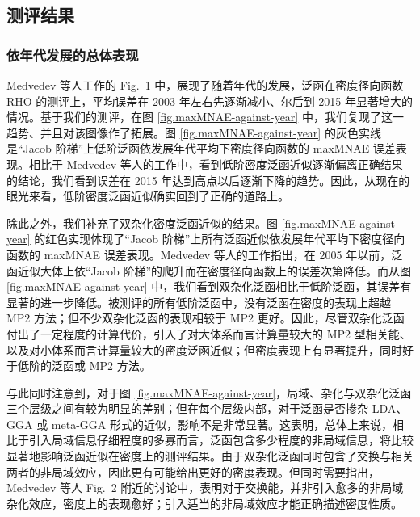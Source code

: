 \subsection{测评结果}

\subsubsection{依年代发展的总体表现}

Medvedev 等人工作的 Fig.\ 1 中，展现了随着年代的发展，泛函在密度径向函数 RHO 的测评上，平均误差在 2003 年左右先逐渐减小、尔后到 2015 年显著增大的情况。基于我们的测评，在图 \ref{fig.maxMNAE-against-year} 中，我们复现了这一趋势、并且对该图像作了拓展。图 \ref{fig.maxMNAE-against-year} 的灰色实线是“Jacob 阶梯”上低阶泛函依发展年代平均下密度径向函数的 maxMNAE 误差表现。相比于 Medvedev 等人的工作中，看到低阶密度泛函近似逐渐偏离正确结果的结论，我们看到误差在 2015 年达到高点以后逐渐下降的趋势。因此，从现在的眼光来看，低阶密度泛函近似确实回到了正确的道路上。

除此之外，我们补充了双杂化密度泛函近似的结果。图 \ref{fig.maxMNAE-against-year} 的红色实现体现了“Jacob 阶梯”上所有泛函近似依发展年代平均下密度径向函数的 maxMNAE 误差表现。Medvedev 等人的工作指出，在 2005 年以前，泛函近似大体上依“Jacob 阶梯”的爬升而在密度径向函数上的误差次第降低。而从图 \ref{fig.maxMNAE-against-year} 中，我们看到双杂化泛函相比于低阶泛函，其误差有显著的进一步降低。被测评的所有低阶泛函中，没有泛函在密度的表现上超越 MP2 方法；但不少双杂化泛函的表现相较于 MP2 更好。因此，尽管双杂化泛函付出了一定程度的计算代价，引入了对大体系而言计算量较大的 MP2 型相关能、以及对小体系而言计算量较大的密度泛函近似；但密度表现上有显著提升，同时好于低阶的泛函或 MP2 方法。

与此同时注意到，对于图 \ref{fig.maxMNAE-against-year}，局域、杂化与双杂化泛函三个层级之间有较为明显的差别；但在每个层级内部，对于泛函是否掺杂 LDA、GGA 或 meta-GGA 形式的近似，影响不是非常显著。这表明，总体上来说，相比于引入局域信息仔细程度的多寡而言，泛函包含多少程度的非局域信息，将比较显著地影响泛函近似在密度上的测评结果。由于双杂化泛函同时包含了交换与相关两者的非局域效应，因此更有可能给出更好的密度表现。但同时需要指出，Medvedev 等人 Fig.\ 2 附近的讨论中，表明对于交换能，并非引入愈多的非局域杂化效应，密度上的表现愈好；引入适当的非局域效应才能正确描述密度性质。

